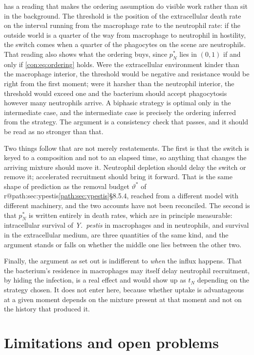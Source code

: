 \documentclass[11pt,a4paper]{report}
\makeatletter
\newcommand{\yp}{\textit{Y.~pestis}}
\providecommand{\mextref}[2]{%
  \ifcsname r@#1\endcsname\cref{#1}\else#2\fi}
\theoremstyle{plain}
\theoremstyle{remark}
\makeatother
\begin{document}
 has a reading that makes the ordering assumption do
visible work rather than sit in the background. The threshold is the position
of the extracellular death rate on the interval running from the macrophage
rate to the neutrophil rate: if the outside world is a quarter of the way
from macrophage to neutrophil in hostility, the switch comes when a quarter
of the phagocytes on the scene are neutrophils. That reading also shows what
the ordering buys, since $p_N^{\ast}$ lies in $(0,1)$ if and only if
\cref{con:eq:ordering} holds. Were the extracellular environment kinder than
the macrophage interior, the threshold would be negative and resistance would
be right from the first moment; were it harsher than the neutrophil interior,
the threshold would exceed one and the bacterium should accept phagocytosis
however many neutrophils arrive. A biphasic strategy is optimal only in the
intermediate case, and the intermediate case is precisely the ordering
inferred from the strategy. The argument is a consistency check that passes,
and it should be read as no stronger than that.

Two things follow that are not merely restatements. The first is that the
switch is keyed to a composition and not to an elapsed time, so anything that
changes the arriving mixture should move it. Neutrophil depletion should
delay the switch or remove it; accelerated recruitment should bring it
forward. That is the same shape of prediction as the removal budget
$\vartheta^{\ast}$ of \mextref{path:sec:ypestis}{\S8.5.4}, reached from a
different model with different machinery, and the two accounts have not been
reconciled. The second is that $p_N^{\ast}$ is written entirely in death
rates, which are in principle measurable: intracellular survival of \yp{} in
macrophages and in neutrophils, and survival in the extracellular medium, are
three quantities of the same kind, and the argument stands or falls on
whether the middle one lies between the other two.

Finally, the argument as set out is indifferent to \emph{when} the influx
happens. That the bacterium's residence in macrophages may itself delay
neutrophil recruitment, by hiding the infection, is a real effect and would
show up as $t_N$ depending on the strategy chosen. It does not enter here,
because whether uptake is advantageous at a given moment depends on the
mixture present at that moment and not on the history that produced it.

\section{Limitations and open problems}
\label{con:sec:limits}
\end{document}
